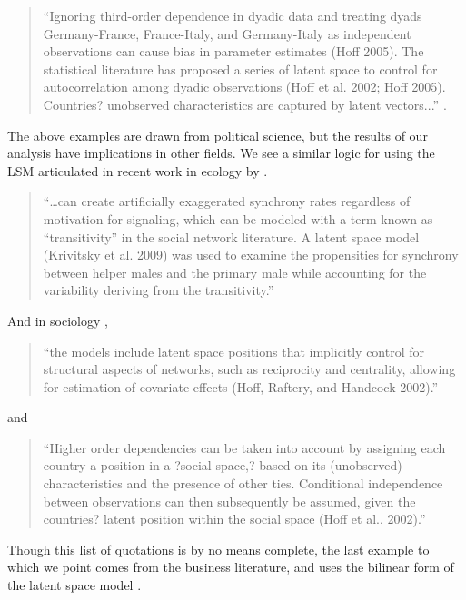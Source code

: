 \documentclass[11pt]{article}
\begin{document}
\begin{quote}
``Ignoring third-order dependence in dyadic data and treating dyads
  Germany-France, France-Italy, and Germany-Italy as independent
  observations can cause bias in parameter estimates (Hoff 2005). The
  statistical literature has proposed a series of latent space to
  control for autocorrelation among dyadic observations (Hoff et
  al. 2002; Hoff 2005). Countries? unobserved characteristics are
  captured by latent vectors...'' \citep[p. 17]{cao2016transnational}.
\end{quote}

The above examples are drawn from political science, but the results
of our analysis have implications in other fields. We see a similar
logic for using the LSM articulated in recent work in ecology by
\citet[p. 989]{nomano2015unrelated}.

\begin{quote}
``\ldots can create artificially exaggerated synchrony rates
  regardless of motivation for signaling, which can be modeled with a
  term known as ``transitivity'' in the social network literature. A
  latent space model (Krivitsky et al. 2009) was used to examine the
  propensities for synchrony between helper males and the primary male
  while accounting for the variability deriving from the
  transitivity.''
\end{quote}


And in sociology \citet[p. 157]{spillane2017elephant},

 \begin{quote} ``the models include latent space positions that implicitly control for structural aspects of networks, such as reciprocity and centrality, allowing for estimation of covariate effects (Hoff, Raftery, and Handcock 2002).''
 \end{quote}
 
 and  \citet[p. 107]{berlusconi2017determinants}
 
 \begin{quote} ``Higher order dependencies can be taken into account by assigning each country a position in a ?social space,? based on its (unobserved) characteristics and the presence of other ties. Conditional independence between observations can then subsequently be assumed, given the countries? latent position within the social space (Hoff et al., 2002).''
 \end{quote}




Though this list of quotations is by no means complete, the last
example to which we point comes from the business literature, and uses
the bilinear form of the latent space model
\citep[p. 7]{dass2011impact}.
\end{document}
